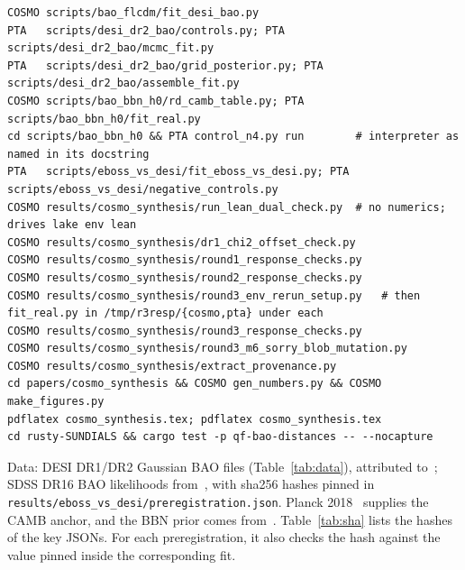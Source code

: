 \documentclass[11pt]{article}
\begin{document}
\begin{lstlisting}
COSMO scripts/bao_flcdm/fit_desi_bao.py
PTA   scripts/desi_dr2_bao/controls.py; PTA scripts/desi_dr2_bao/mcmc_fit.py
PTA   scripts/desi_dr2_bao/grid_posterior.py; PTA scripts/desi_dr2_bao/assemble_fit.py
COSMO scripts/bao_bbn_h0/rd_camb_table.py; PTA scripts/bao_bbn_h0/fit_real.py
cd scripts/bao_bbn_h0 && PTA control_n4.py run        # interpreter as named in its docstring
PTA   scripts/eboss_vs_desi/fit_eboss_vs_desi.py; PTA scripts/eboss_vs_desi/negative_controls.py
COSMO results/cosmo_synthesis/run_lean_dual_check.py  # no numerics; drives lake env lean
COSMO results/cosmo_synthesis/dr1_chi2_offset_check.py
COSMO results/cosmo_synthesis/round1_response_checks.py
COSMO results/cosmo_synthesis/round2_response_checks.py
COSMO results/cosmo_synthesis/round3_env_rerun_setup.py   # then fit_real.py in /tmp/r3resp/{cosmo,pta} under each
COSMO results/cosmo_synthesis/round3_response_checks.py
COSMO results/cosmo_synthesis/round3_m6_sorry_blob_mutation.py
COSMO results/cosmo_synthesis/extract_provenance.py
cd papers/cosmo_synthesis && COSMO gen_numbers.py && COSMO make_figures.py
pdflatex cosmo_synthesis.tex; pdflatex cosmo_synthesis.tex
cd rusty-SUNDIALS && cargo test -p qf-bao-distances -- --nocapture
\end{lstlisting}
Data: DESI DR1/DR2 Gaussian BAO files (Table~\ref{tab:data}), attributed to~\cite{desi2024vi,desi2025dr2}; SDSS DR16 BAO likelihoods from~\cite{eboss2021,dmdb2020},
with sha256 hashes pinned in \texttt{results/eboss\_vs\_desi/preregistration.json}. Planck 2018~\cite{planck2018} supplies the CAMB anchor, and the
BBN prior comes from~\cite{schoneberg2024}. Table~\ref{tab:sha} lists the hashes of the key JSONs. For each preregistration, it also
checks the hash against the value pinned inside the corresponding fit.
\begin{table}[h]\centering\caption{DESI data files.}\label{tab:data}\resizebox{\textwidth}{!}{}\end{table}
\begin{table}[h]\centering\caption{sha256 of key JSONs, computed by \texttt{gen\_numbers.py} at build time.}\label{tab:sha}\resizebox{\textwidth}{!}{}\end{table}
\end{document}

